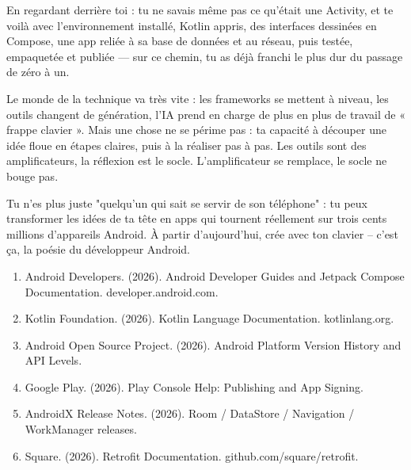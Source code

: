 En regardant derrière toi : tu ne savais même pas ce qu’était une Activity, et te voilà avec l’environnement installé, Kotlin appris, des interfaces dessinées en Compose, une app reliée à sa base de données et au réseau, puis testée, empaquetée et publiée — sur ce chemin, tu as déjà franchi le plus dur du passage de zéro à un.

Le monde de la technique va très vite : les frameworks se mettent à niveau, les outils changent de génération, l’IA prend en charge de plus en plus de travail de « frappe clavier ». Mais une chose ne se périme pas : ta capacité à découper une idée floue en étapes claires, puis à la réaliser pas à pas. Les outils sont des amplificateurs, la réflexion est le socle. L’amplificateur se remplace, le socle ne bouge pas.

Tu n'es plus juste "quelqu'un qui sait se servir de son téléphone" : tu peux transformer les idées de ta tête en apps qui tournent réellement sur trois cents millions d'appareils Android. À partir d'aujourd'hui, crée avec ton clavier – c'est ça, la poésie du développeur Android.


\begin{enumerate}
  \item Android Developers. (2026). Android Developer Guides and Jetpack Compose Documentation. developer.android.com.
  \item Kotlin Foundation. (2026). Kotlin Language Documentation. kotlinlang.org.
  \item Android Open Source Project. (2026). Android Platform Version History and API Levels.
  \item Google Play. (2026). Play Console Help: Publishing and App Signing.
  \item AndroidX Release Notes. (2026). Room / DataStore / Navigation / WorkManager releases.
  \item Square. (2026). Retrofit Documentation. github.com/square/retrofit.
\end{enumerate}
